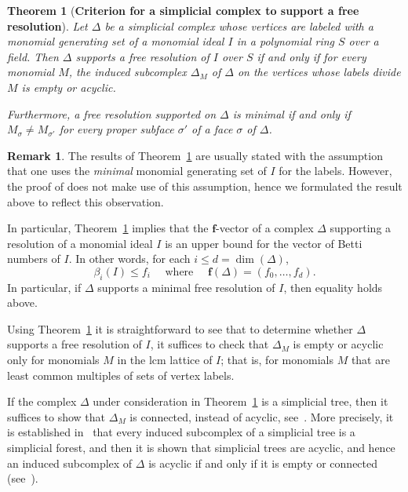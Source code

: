\documentclass[11pt]{article}
\newtheorem{theorem}[theo]{Theorem}
\theoremstyle{definition}
\newtheorem{rema}[theo]{Remark}
\numberwithin{equation}{section}
\newcommand{\f}{\mathbf{f}}
\newcommand{\D}{\Delta}
\newcommand{\qwhere}{\quad \mbox{ where } \quad }
\begin{document}
\begin{theorem}[{\bf Criterion for a simplicial complex to support a free  resolution}]\label{t:BPS}
          Let $\D$ be a simplicial complex whose vertices are labeled
          with a monomial generating set of a monomial ideal
          $I$  in a polynomial ring $S$ over a field.
          Then $\D$ supports a free resolution of $I$ over $S$ if and
          only if for every monomial $M$, the induced subcomplex
          $\D_M$ of $\D$ on the vertices whose labels divide $M$ is
          empty or acyclic.

Furthermore, a free resolution supported on $\D$ is
                minimal if and only if $M_{\sigma} \neq M_{\sigma'}$
                for every proper subface $\sigma'$ of a face $\sigma$
                of $\D$.
\end{theorem} 

\begin{rema}
The results of Theorem~\ref{t:BPS} are usually stated with the assumption that one uses the {\it minimal} monomial generating set of $I$ for the labels.  However, the proof of \cite[Lemma 2.2]{BPS} does not make use of this assumption, hence we formulated the result above to reflect this observation. 
\end{rema}


In particular, Theorem~\ref{t:BPS}  implies that the $\f$-vector of a
complex $\D$ supporting a resolution of a monomial ideal $I$ is an
upper bound for the vector of Betti numbers of $I$. In other words,
for each $i \leq d=\dim(\D)$,
$$\beta_i(I)\leq f_{i} \qwhere \f(\D)=(f_0,\ldots,f_d).$$ In
particular, if $\D$ supports a minimal free resolution of $I$, then
equality holds above.

Using Theorem~\ref{t:BPS} it is straightforward to see that to
determine whether $\D$ supports a free resolution of $I$, it suffices
to check that $\D_M$ is empty or acyclic only for monomials $M$ in the
lcm lattice of $I$; that is, for monomials $M$ that are least common
multiples of sets of vertex labels.


If the complex $\D$ under consideration in Theorem~\ref{t:BPS} is a
simplicial tree, then it suffices to show that $\D_M$ is connected, instead of acyclic, see~\cite{F14}.  More precisely, it is established in~\cite{F14} that
every induced subcomplex of a simplicial tree is  a simplicial
forest, and then it is shown that simplicial trees are acyclic, and hence an induced subcomplex of $\D$ is acyclic if and only if  it is empty or connected \textup{(}see~\cite[Theorems~2.5, 2.9, 3.2]{F14}\textup{)}.
\end{document}
